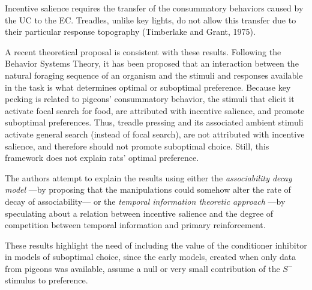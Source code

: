 \documentclass[a4paper,12pt]{article}
\begin{document}
Incentive salience requires the transfer of the consummatory behaviors caused by the UC to the EC. Treadles, unlike key lights, do not allow this transfer due to their particular response topography (Timberlake and Grant, 1975).

A recent theoretical proposal is consistent with these results. Following the Behavior Systems Theory, it has been proposed that an interaction between the natural foraging sequence of an organism and the stimuli and responses available in the task is what determines optimal or suboptimal preference. Because key pecking is related to pigeons’ consummatory behavior, the stimuli that elicit it activate focal search for food, are attributed with incentive salience, and promote suboptimal preferences. Thus, treadle pressing and its associated ambient stimuli activate general search (instead of focal search), are not attributed with incentive salience, and therefore should not promote suboptimal choice. Still, this framework does not explain rats' optimal preference.

The authors attempt to explain the results using either the {\itshape associability decay model} ---by proposing that the manipulations could somehow alter the rate of decay of associability--- or the {\itshape temporal information theoretic approach} ---by speculating about a relation between incentive salience and the degree of competition between temporal information and primary reinforcement.

These results highlight the need of including the value of the conditioner inhibitor in models of suboptimal choice, since the early models, created when only data from pigeons was available, assume a null or very small contribution of the $S^-$ stimulus to preference.
\end{document}
